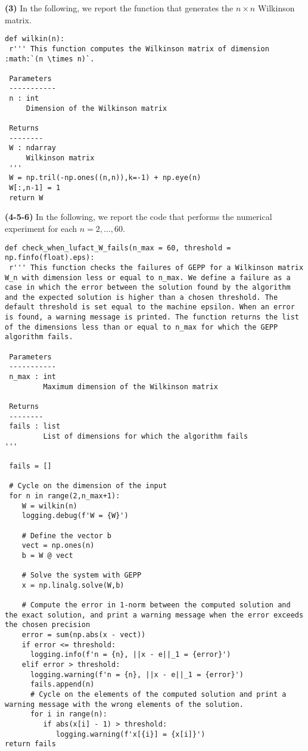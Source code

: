 \documentclass[a4paper,11pt]{article}
\begin{document}
\noindent \textbf{(3)} In the following, we report the function that generates the $n \times n $ Wilkinson matrix.
\begin{verbatim}
def wilkin(n):
 r''' This function computes the Wilkinson matrix of dimension :math:`(n \times n)`.
 
 Parameters
 -----------
 n : int
     Dimension of the Wilkinson matrix
 
 Returns
 --------
 W : ndarray
     Wilkinson matrix
 '''
 W = np.tril(-np.ones((n,n)),k=-1) + np.eye(n)
 W[:,n-1] = 1
 return W
\end{verbatim}
\noindent \textbf{(4-5-6)} In the following, we report the code that performs the numerical experiment for each $n=2,\dots,60$.

\begin{verbatim}
def check_when_lufact_W_fails(n_max = 60, threshold = np.finfo(float).eps):
 r''' This function checks the failures of GEPP for a Wilkinson matrix W_n with dimension less or equal to n_max. We define a failure as a case in which the error between the solution found by the algorithm and the expected solution is higher than a chosen threshold. The default threshold is set equal to the machine epsilon. When an error is found, a warning message is printed. The function returns the list of the dimensions less than or equal to n_max for which the GEPP algorithm fails.

 Parameters
 -----------
 n_max : int
         Maximum dimension of the Wilkinson matrix

 Returns
 --------
 fails : list
         List of dimensions for which the algorithm fails
'''

 fails = []

 # Cycle on the dimension of the input
 for n in range(2,n_max+1):
    W = wilkin(n)
    logging.debug(f'W = {W}')

    # Define the vector b
    vect = np.ones(n)
    b = W @ vect

    # Solve the system with GEPP
    x = np.linalg.solve(W,b)

    # Compute the error in 1-norm between the computed solution and the exact solution, and print a warning message when the error exceeds the chosen precision
    error = sum(np.abs(x - vect))
    if error <= threshold:
      logging.info(f'n = {n}, ||x - e||_1 = {error}')
    elif error > threshold:
      logging.warning(f'n = {n}, ||x - e||_1 = {error}')
      fails.append(n)
      # Cycle on the elements of the computed solution and print a warning message with the wrong elements of the solution.
      for i in range(n):
         if abs(x[i] - 1) > threshold:
            logging.warning(f'x[{i}] = {x[i]}')
return fails

\end{verbatim}
\end{document}

